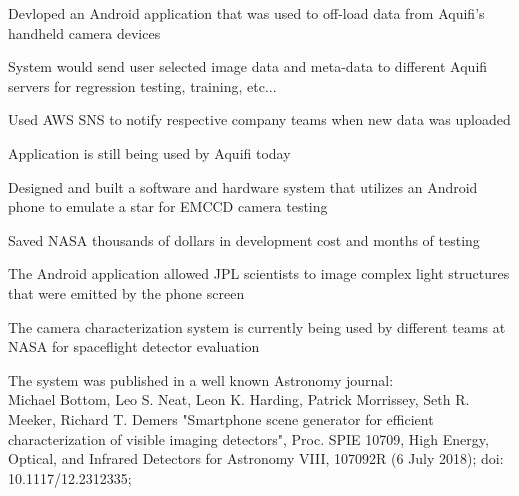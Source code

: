 \documentclass[letterpaper]{deedy-resume} %
\begin{document}
\begin{minipage}[t]{0.66\textwidth}
\begin{tightitemize}
\end{tightitemize}

\begin{tightitemize}
	\item Devloped an Android application that was used to off-load data from Aquifi's handheld camera devices
	\item System would send user selected image data and meta-data to different Aquifi servers for regression testing, training, etc...
	\item Used AWS SNS to notify respective company teams when new data was uploaded
	\item Application is still being used by Aquifi today
\end{tightitemize}
\sectionspace %

	\begin{tightitemize}
			\item 	Designed and built a software and hardware system that utilizes an Android phone to emulate a star for EMCCD camera testing
			\item Saved NASA thousands of dollars in development cost and months of testing
			\item The Android application allowed JPL scientists to image complex light structures that were emitted by the phone screen
			\item 	The camera characterization system is currently being used by different teams at NASA for spaceflight detector evaluation 
			\item The system was published in a well known Astronomy journal:\\
				Michael Bottom, Leo S. Neat, Leon K. Harding, Patrick Morrissey, Seth R. Meeker, Richard T. Demers  "Smartphone scene generator for efficient characterization of visible imaging detectors", Proc. SPIE 10709, High Energy, Optical, and Infrared Detectors for Astronomy VIII, 107092R (6 July 2018); doi: 10.1117/12.2312335;
	\end{tightitemize}


\end{minipage}
\end{document}
